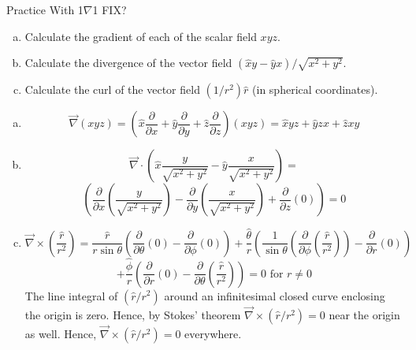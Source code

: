 \documentclass{esg8022pset}
\newcommand{\Kgrad}{\left(\hat{x} \frac{\partial}{\partial x} + \hat{y} \frac{\partial}{\partial y} + \hat{z} \frac{\partial}{\partial z}\right)}
\newcommand{\KKdiv}[6]{{#4}\left(\frac{\partial}{\partial x}{#1} {#5} \frac{\partial}{\partial y}{#2} {#6}\frac{\partial}{\partial z}{#3} \right)}
\begin{document}
\begin{ForPSet}
\end{ForPSet}

\begin{problem}{Practice With \texorpdfstring{1$\nabla$1}{.∇.}}
FIX?
  \begin{enumerate}[(a)]
    \item Calculate the gradient of each of the scalar field $xyz$.
    \item Calculate the divergence of the vector field $(\hat{x} y - \hat{y} x) / \sqrt{x^2 + y^2}$.
    \item Calculate the curl of the vector field $(1/r^2)\hat{r}$ (in spherical coordinates).
  \end{enumerate}
\end{problem}
\begin{solution}
  \begin{enumerate}[(a)]
    \item $$\vec\nabla (xyz) = \Kgrad (xyz) = \hat x yz + \hat y zx + \hat z xy$$
    \item $$\vec{\nabla}\cdot \left(\hat{x} \frac{y}{\sqrt{x^2+y^2}} - \hat{y} \frac{x}{\sqrt{x^2+y^2}}\right) = $$ $$\KKdiv{\left(\frac{y}{\sqrt{x^2+y^2}}\right)}{\left(\frac{x}{\sqrt{x^2+y^2}}\right)}{(0)}{}{-}{+} = 0$$
    \item $${\vec{\nabla} \times \left( \frac{\hat r}{r^2} \right)} = \frac{\hat r}{r \sin \theta} \left( \frac{\partial}{\partial \theta} \left( 0 \right) - \frac{\partial}{\partial \phi} \left( 0 \right)\right) + \frac{\hat\theta}{r} \left( \frac{1}{\sin \theta} \left( \frac{\partial}{\partial \phi} \left(\frac{\hat r}{r^{2}} \right) \right)-   \frac{\partial}{\partial r} \left( 0 \right) \right)$$ $$+  \frac{\hat\phi}{r} \left( \frac{\partial}{\partial r} \left( 0 \right) - \frac{\partial}{\partial \theta} \left( \frac{\hat r}{r^{2}}\right) \right) = 0\text{ for }r \neq 0$$
      The line integral of $\left( \hat r / r^2 \right)$ around an infinitesimal closed curve enclosing the origin is zero. Hence, by Stokes' theorem $\vec{\nabla}\times\left({\hat r/r^2}\right) = 0$ near the origin as well. Hence, ${\vec{\nabla} \times \left( { \hat r / r^2} \right)} = 0$ everywhere.
  \end{enumerate}
\end{solution}
\end{document}
